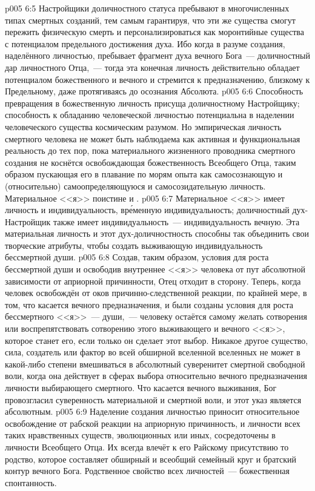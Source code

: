 \vs p005 6:5 \pc Настройщики доличностного статуса пребывают в многочисленных типах смертных созданий, тем самым гарантируя, что эти же существа смогут пережить физическую смерть и персонализироваться как моронтийные существа с потенциалом предельного достижения духа. Ибо когда в разуме создания, наделённого личностью, пребывает фрагмент духа вечного Бога~--- доличностный дар личностного Отца,~--- тогда эта конечная личность действительно обладает потенциалом божественного и вечного и стремится к предназначению, близкому к Предельному, даже протягиваясь до осознания Абсолюта.
\vs p005 6:6 Способность превращения в божественную личность присуща доличностному Настройщику; способность к обладанию человеческой личностью потенциальна в наделении человеческого существа космическим разумом. Но эмпирическая личность смертного человека не может быть наблюдаема как активная и функциональная реальность до тех пор, пока материального жизненного проводника смертного создания не коснётся освобождающая божественность Всеобщего Отца, таким образом пускающая его в плавание по морям опыта как самосознающую и (относительно) самоопределяющуюся и самосозидательную личность. Материальное <<я>> поистине и .
\vs p005 6:7 \pc Материальное <<я>> имеет личность и индивидуальность, вр\'еменную индивидуальность; доличностный дух\hyp{}Настройщик также имеет индивидуальность~--- индивидуальность вечную. Эта материальная личность и этот дух\hyp{}доличностность способны так объединить свои творческие атрибуты, чтобы создать выживающую индивидуальность бессмертной души.
\vs p005 6:8 Создав, таким образом, условия для роста бессмертной души и освободив внутреннее <<я>> человека от пут абсолютной зависимости от априорной причинности, Отец отходит в сторону. Теперь, когда человек освобождён от оков причинно\hyp{}следственной реакции, по крайней мере, в том, что касается вечного предназначения, и были созданы условия для роста бессмертного <<я>>~--- души,~--- человеку остаётся самому желать сотворения или воспрепятствовать сотворению этого выживающего и вечного <<я>>, которое станет его, если только он сделает этот выбор. Никакое другое существо, сила, создатель или фактор во всей обширной вселенной вселенных не может в какой\hyp{}либо степени вмешиваться в абсолютный суверенитет смертной свободной воли, когда она действует в сферах выбора относительно вечного предназначения личности выбирающего смертного. Что касается вечного выживания, Бог провозгласил суверенность материальной и смертной воли, и этот указ является абсолютным.
\vs p005 6:9 \pc Наделение создания личностью приносит относительное освобождение от рабской реакции на априорную причинность, и личности всех таких нравственных существ, эволюционных или иных, сосредоточены в личности Всеобщего Отца. Их всегда влечёт к его Райскому присутствию то родство, которое составляет обширный и всеобщий семейный круг и братский контур вечного Бога. Родственное свойство всех личностей~--- божественная спонтанность.
